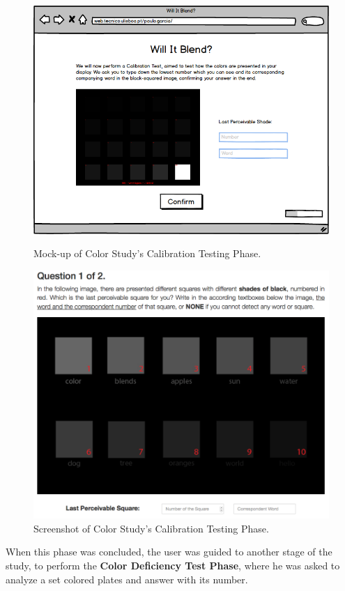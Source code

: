 \begin{figure}[htbp]
  \centering
  \begin{minipage}{0.49\textwidth}
		\centering
	  \includegraphics[width=\textwidth]{images/implementation/mockup_calibration.png}
	  \caption[Mock-up of Color Study's Calibration Testing Phase.]{Mock-up of Color Study's Calibration Testing Phase.}
	  \label{fig:mockup_calibration}
  \end{minipage} \hfill
	\begin{minipage}{0.49\textwidth}
		\centering
		\includegraphics[width=\textwidth]{images/implementation/screen_calibration.png}
		\caption[Screenshot of Color Study's Calibration Testing Phase.]{Screenshot of Color Study's Calibration Testing Phase.}
		\label{fig:screen_calibration}
	\end{minipage}
\end{figure}
%
When this phase was concluded, the user was guided to another stage of the study, to perform the \textbf{Color Deficiency Test Phase}, where
he was asked to analyze a set colored plates and answer with its number. \par
%
%
